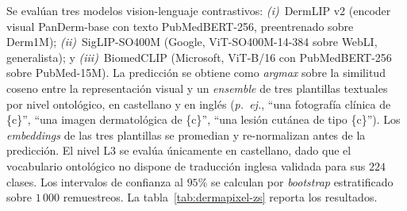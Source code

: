 Se evalúan tres modelos vision-lenguaje contrastivos:
\emph{(i)}~DermLIP v2 (encoder visual PanDerm-base con texto
PubMedBERT-256, preentrenado sobre Derm1M);
\emph{(ii)}~SigLIP-SO400M (Google, ViT-SO400M-14-384 sobre WebLI,
generalista); y \emph{(iii)}~BiomedCLIP (Microsoft, ViT-B/16 con
PubMedBERT-256 sobre PubMed-15M). La predicción se obtiene como
\emph{argmax} sobre la similitud coseno entre la representación
visual y un \emph{ensemble} de tres plantillas textuales por nivel
ontológico, en castellano y en inglés
(\textit{p.~ej.}, ``una fotografía clínica de \{c\}'', ``una
imagen dermatológica de \{c\}'', ``una lesión cutánea de tipo
\{c\}''). Los \emph{embeddings} de las tres plantillas se promedian
y re-normalizan antes de la predicción. El nivel L3 se evalúa
únicamente en castellano, dado que el vocabulario ontológico no
dispone de traducción inglesa validada para sus $224$ clases. Los
intervalos de confianza al $95\%$ se calculan por
\emph{bootstrap} estratificado sobre $1\,000$ remuestreos. La
tabla~\ref{tab:dermapixel-zs} reporta los resultados.

